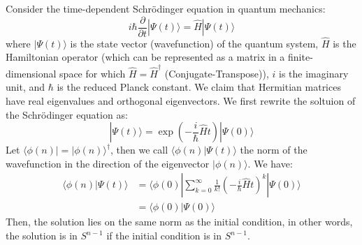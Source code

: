 \documentclass[11pt]{article}
\begin{document}
\begin{example}
    Consider the time-dependent Schrödinger equation in quantum mechanics:
    $$i\hbar \frac{\partial}{\partial t} | \Psi(t) \rangle = \hat{H} | \Psi(t) \rangle$$
    where \( | \Psi(t) \rangle \) is the state vector (wavefunction) of the quantum system, \( \hat{H} \) is the Hamiltonian operator (which can be represented as a matrix in a finite-dimensional space for which \( \hat{H} = \hat{H}^\dagger \) (Conjugate-Transpose)), \( i \) is the imaginary unit, and \( \hbar \) is the reduced Planck constant. We claim that Hermitian matrices have real eigenvalues and orthogonal eigenvectors. We first rewrite the soltuion of the Schrödinger equation as:
    $$
        | \Psi(t) \rangle = \exp \left(-\frac{i}{\hbar} \hat{H} t \right) | \Psi(0) \rangle
    $$
    Let $\langle \phi(n) | = | \phi(n) \rangle^\dagger$, then we call $\langle \phi(n) | \Psi(t) \rangle$ the norm of the wavefunction in the direction of the eigenvector \( | \phi(n) \rangle \). We have:
    \begin{align*}
        \langle \phi(n) | \Psi(t) \rangle
        &= \langle \phi(0) | \sum_{k=0}^{\infty} \frac{1}{k!} \left(-\frac{i}{\hbar} \hat{H} t \right)^k | \Psi(0) \rangle \\  
        &= \langle \phi(0) | \Psi(0) \rangle
    \end{align*}
    Then, the solution lies on the same norm as the initial condition, in other words, the solution is in $S^{n-1}$ if the initial condition is in $S^{n-1}$.
\end{example}
\end{document}
